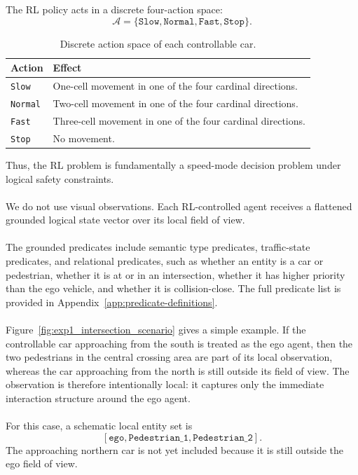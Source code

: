 The RL policy acts in a discrete four-action space:
\[
\mathcal{A} = \{\texttt{Slow}, \texttt{Normal}, \texttt{Fast}, \texttt{Stop}\}.
\]

\begin{table}[H]
\centering
\small
\caption{Discrete action space of each controllable car.}
\label{tab:exp1-action-space}
\begin{tabularx}{\linewidth}{@{}l X@{}}
\toprule
\textbf{Action} & \textbf{Effect} \\
\midrule
\texttt{Slow} & One-cell movement in one of the four cardinal directions. \\
\texttt{Normal} & Two-cell movement in one of the four cardinal directions. \\
\texttt{Fast} & Three-cell movement in one of the four cardinal directions. \\
\texttt{Stop} & No movement. \\
\bottomrule
\end{tabularx}
\end{table}

\noindent Thus, the RL problem is fundamentally a speed-mode decision problem under logical safety constraints.
\\
\\
We do not use visual observations. Each RL-controlled agent receives a flattened grounded logical state vector over its local field of view.
\\
\\
\noindent The grounded predicates include semantic type predicates, traffic-state predicates, and relational predicates, such as whether an entity is a car or pedestrian, whether it is at or in an intersection, whether it has higher priority than the ego vehicle, and whether it is collision-close. The full predicate list is provided in Appendix~\ref{app:predicate-definitions}.
\\
\\
Figure~\ref{fig:exp1_intersection_scenario} gives a simple example. If the controllable car approaching from the south is treated as the ego agent, then the two pedestrians in the central crossing area are part of its local observation, whereas the car approaching from the north is still outside its field of view. The observation is therefore intentionally local: it captures only the immediate interaction structure around the ego agent.
\\
\\
For this case, a schematic local entity set is
\[
[\texttt{ego}, \texttt{Pedestrian\_1}, \texttt{Pedestrian\_2}].
\]
\noindent The approaching northern car is not yet included because it is still outside the ego field of view.

